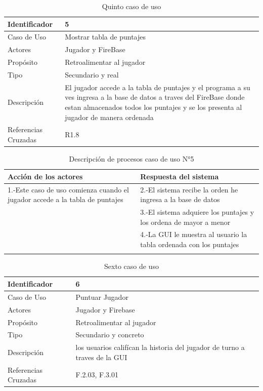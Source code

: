 \begin{table}[H]
    \begin{center}
        \begin{tabular}{| l | m{12cm} |}        
        	\hline 
        	Identificador & 5\\
        	\hline
        	Caso de Uso & Mostrar tabla de puntajes\\
        	\hline
        	Actores & Jugador y FireBase\\
        	\hline
        	Propósito & Retroalimentar al jugador\\
        	\hline
        	Tipo & Secundario y real\\
        	\hline
        	Descripción & El jugador accede a la tabla de puntajes y el programa a su ves ingresa a la base de datos a traves del FireBase donde estan almacenados todos los puntajes y se los presenta al jugador de manera ordenada\\
        	\hline
        	Referencias Cruzadas & R1.8\\
        	\hline
        \end{tabular}
    \caption{Quinto caso de uso}
    \end{center}
\end{table}

\begin{longtable}[H]{| m{8cm} | m{8cm} |}
\hline 
\textbf{Acción de los actores} & \textbf{Respuesta del sistema}\\
\hline 
1.-Este caso de uso comienza cuando el jugador accede a la tabla de puntajes & 2.-El sistema recibe la orden he ingresa a la base de datos\\
\hline
& 3.-El sistema adquiere los puntajes y los ordena de mayor a menor\\
\hline
& 4.-La GUI le muestra al usuario la tabla ordenada con los puntajes\\
\hline
\caption{Descripción de procesos caso de uso N°5}
\end{longtable}

\begin{table}[H]
    \begin{center}
        \begin{tabular}{| l | m{12cm} |}        
        	\hline 
        	Identificador & 6\\
        	\hline
        	Caso de Uso & Puntuar Jugador\\
        	\hline
        	Actores & Jugador y Firebase\\
        	\hline
        	Propósito & Retroalimentar al jugador\\
        	\hline
        	Tipo & Secundario y concreto\\
        	\hline
        	Descripción & los usuarios califícan la historia del jugador de turno a traves de la GUI\\
        	\hline
        	Referencias Cruzadas & F.2.03, F.3.01\\
        	\hline
        \end{tabular}
    \caption{Sexto caso de uso}
    \end{center}
\end{table}

